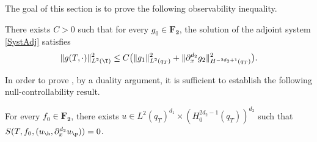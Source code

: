 The goal of this section is to prove the following observability inequality.
\begin{prop}\label{PropObs1A}
There exists $C>0$ such that for every $g_0 \in \mathbf{F_2}$, the solution of the adjoint system \eqref{SystAdj} satisfies
\begin{equation} \label{IO_H_Obs1A}
\| g(T,\cdot) \|_{L^2(\T)}^2 \leq C \bigl(\| g_1\|_{L^2(q_T)}^2 + \|\partial_{x}^{d_2} g_2\|_{H^{-2d_2+1}(q_T)}^2 \bigr).
\end{equation}
\end{prop}
In order to prove , by a duality argument, it is sufficient to establish the following null-controllability result.
\begin{prop}\label{PropNullControldx}
For every $f_0 \in \mathbf{F_2}$, there exists $u \in L^2(q_T)^{d_1}\times(H_0^{2d_2-1}(q_T))^{d_2}$ such that $S(T, f_0, (u_{\h}, \partial_{x}^{d_2} u_{\p})) = 0$.
\end{prop}
